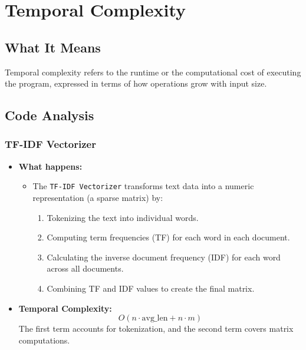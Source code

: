 \documentclass[runningheads,a4paper,11pt]{report}
\begin{document}
\newpage
\section{Temporal Complexity}

\subsection{What It Means}
\label{section:it-means}
Temporal complexity refers to the runtime or the computational cost of executing the program, expressed in terms of how operations grow with input size.

\subsection{Code Analysis}
\label{section:codeAnalysis}

\subsubsection{TF-IDF Vectorizer}
\label{section:vectorizer}
\begin{itemize}
  \item \textbf{What happens:}
  \begin{itemize}
    \item The \texttt{TF-IDF Vectorizer} transforms text data into a numeric representation (a sparse matrix) by:
    \begin{enumerate}
      \item Tokenizing the text into individual words.
      \item Computing term frequencies (TF) for each word in each document.
      \item Calculating the inverse document frequency (IDF) for each word across all documents.
      \item Combining TF and IDF values to create the final matrix.
    \end{enumerate}
  \end{itemize}
  \item \textbf{Temporal Complexity:}
  \[
  O(n \cdot \text{avg\_len} + n \cdot m)
  \]
  The first term accounts for tokenization, and the second term covers matrix computations.
\end{itemize}
\end{document}
